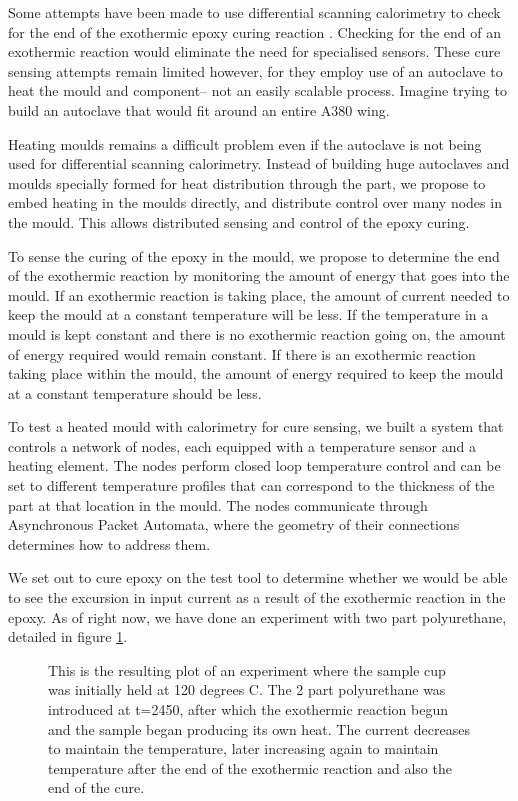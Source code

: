 \documentclass[]{report}
\begin{document}
Some attempts have been made to use differential scanning calorimetry to check for the end of the exothermic epoxy curing reaction \cite{Ryan1979203}.  Checking for the end of an exothermic reaction would eliminate the need for specialised sensors.  These cure sensing attempts remain limited however, for they employ use of an autoclave to heat the mould and component-- not an easily scalable process.  Imagine trying to build an autoclave that would fit around an entire A380 wing.

Heating moulds remains a difficult problem even if the autoclave is not being used for differential scanning calorimetry.  Instead of building huge autoclaves and moulds specially formed for heat distribution through the part, we propose to embed heating in the moulds directly, and distribute control over many nodes in the mould.  This allows distributed sensing and control of the epoxy curing.

To sense the curing of the epoxy in the mould, we propose to determine the end of the exothermic reaction by monitoring the amount of energy that goes into the mould.  If an exothermic reaction is taking place, the amount of current needed to keep the mould at a constant temperature will be less.  If the temperature in a mould is kept constant and there is no exothermic reaction going on, the amount of energy required would remain constant.  If there is an exothermic reaction taking place within the mould, the amount of energy required to keep the mould at a constant temperature should be less.

To test a heated mould with calorimetry for cure sensing, we built a system that controls a network of nodes, each equipped with a temperature sensor and a heating element.  The nodes perform closed loop temperature control and can be set to different temperature profiles that can correspond to the thickness of the part at that location in the mould.   The nodes communicate through Asynchronous Packet Automata, where the geometry of their connections determines how to address them.

We set out to cure epoxy on the test tool to determine whether we would be able to see the excursion in input current as a result of the exothermic reaction in the epoxy.  As of right now, we have done an experiment with two part polyurethane, detailed in figure \ref{flir}.

\begin{figure}[htbp]
\label{flir}
\begin{center}
\end{center}
\caption{This is the resulting plot of an experiment where the sample cup was initially held at 120 degrees C.  The 2 part polyurethane was introduced at t=2450, after which the exothermic reaction begun and the sample began producing its own heat.  The current decreases to maintain the temperature, later increasing again to maintain temperature after the end of the exothermic reaction and also the end of the cure.}
\end{figure}
\end{document}
